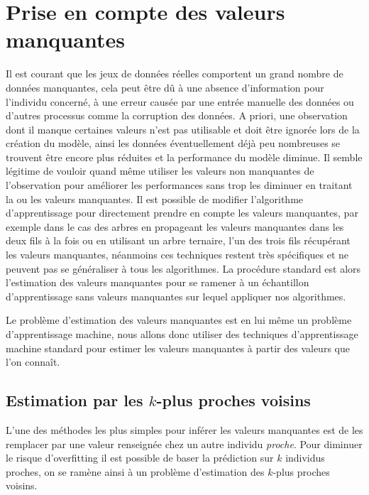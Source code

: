 
\chapter{Prise en compte des valeurs manquantes}
\label{chap:six}

Il est courant que les jeux de données réelles comportent un grand nombre de données manquantes, cela peut être dû à une absence d'information pour l'individu concerné, à une erreur causée par une entrée manuelle des données ou d'autres processus comme la corruption des données. A priori, une observation dont il manque certaines valeurs n'est pas utilisable et doit être ignorée lors de la création du modèle, ainsi les données éventuellement déjà peu nombreuses se trouvent être encore plus réduites et la performance du modèle diminue. Il semble légitime de vouloir quand même utiliser les valeurs non manquantes de l'observation pour améliorer les performances sans trop les diminuer en traitant la ou les valeurs manquantes. Il est possible de modifier l'algorithme d'apprentissage pour directement prendre en compte les valeurs manquantes, par exemple dans le cas des arbres en propageant les valeurs manquantes dans les deux fils à la fois ou en utilisant un arbre ternaire, l'un des trois fils récupérant les valeurs manquantes, néanmoins ces techniques restent très spécifiques et ne peuvent pas se généraliser à tous les algorithmes. La procédure standard est alors l'estimation des valeurs manquantes pour se ramener à un échantillon d'apprentissage sans valeurs manquantes sur lequel appliquer nos algorithmes. 

Le problème d'estimation des valeurs manquantes est en lui même un problème d'apprentissage machine, nous allons donc utiliser des techniques d'apprentissage machine standard pour estimer les valeurs manquantes à partir des valeurs que l'on connaît.

\section{Estimation par les $k$-plus proches voisins}\label{distances}

L'une des méthodes les plus simples pour inférer les valeurs manquantes est de les remplacer par une valeur renseignée chez un autre individu \emph{proche}. Pour diminuer le risque d'overfitting il est possible de baser la prédiction sur $k$ individus proches, on se ramène ainsi à un problème d'estimation des $k$-plus proches voisins.

